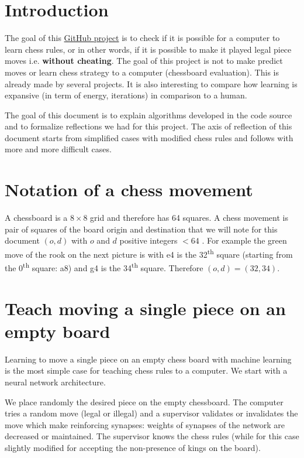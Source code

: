 \documentclass[a4paper,10pt]{article}
\begin{document}
%
\newcommand{\norm}[1]{\left\lVert#1\right\rVert}

\section*{Introduction}

The goal of this \href{https://github.com/Lecrapouille/ChessNeuNeu}{GitHub
  project} is to check if it is possible for a computer to learn chess rules, or
in other words, if it is possible to make it played legal piece moves
i.e. \textbf{without cheating}. The goal of this project is not to make predict
moves or learn chess strategy to a computer (chessboard evaluation). This is
already made by several projects. It is also interesting to compare how learning
is expansive (in term of energy, iterations) in comparison to a human.

The goal of this document is to explain algorithms developed in the code source
and to formalize reflections we had for this project. The axis of reflection of
this document starts from simplified cases with modified chess rules and follows
with more and more difficult cases.

\section{Notation of a chess movement}
A chessboard is a $8 \times 8$ grid and therefore has 64 squares. A chess
movement is pair of squares of the board origin and destination that we will
note for this document $(o, d)$ with $o$ and $d$ positive integers $< 64$ . For
example the green move of the rook on the next picture is  with e4
is the 32\textsuperscript{th} square (starting from the 0\textsuperscript{th}
square: a8) and g4 is the 34\textsuperscript{th} square. Therefore $(o, d) =
(32, 34)$.

\section{Teach moving a single piece on an empty board}

Learning to move a single piece on an empty chess board with machine learning is
the most simple case for teaching chess rules to a computer. We start with a
neural network architecture.

We place randomly the desired piece on the empty chessboard. The computer tries
a random move (legal or illegal) and a supervisor validates or invalidates the
move which make reinforcing synapses: weights of synapses of the network are
decreased or maintained. The supervisor knows the chess rules (while for this
case slightly modified for accepting the non-presence of kings on the board).
\end{document}
